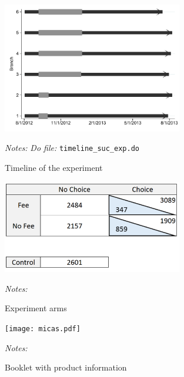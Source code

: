 \documentclass[11pt]{article}
\begin{document}
\begin{figure}[H]
        \caption{Timeline of the experiment}
    \label{micas}
    \begin{center}
        \centering
        \includegraphics[width=0.70\textwidth]{Figuras/timeline_suc_exp_extended.pdf}
    \end{center}
     \footnotesize \textit{Notes: } 
      \footnotesize{ \textit{Do file: }  \texttt{timeline\_suc\_exp.do}}
\end{figure}


\begin{figure}[H]
        \caption{Experiment arms}
    \label{micas}
    \begin{center}
        \centering
        \includegraphics[width=0.70\textwidth]{Figuras/exp_arms.pdf}
    \end{center}
     \footnotesize \textit{Notes: } 
      \footnotesize{ }
\end{figure}


\begin{figure}[H]
        \caption{Booklet with product information}
    \label{micas}
    \begin{center}
        \centering
        \texttt{[image: micas.pdf]}
    \end{center}
     \footnotesize \textit{Notes: } 
      \footnotesize{ }
\end{figure}
\end{document}
